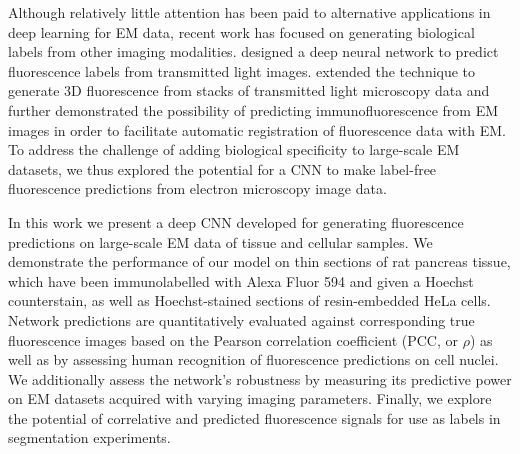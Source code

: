 Although relatively little attention has been paid to alternative applications in deep learning for EM data, recent work has focused on generating biological labels from other imaging modalities. \textcite{christiansen2018silico} designed a deep neural network to predict fluorescence labels from transmitted light images. \textcite{ounkomol2018label} extended the technique to generate 3D fluorescence from stacks of transmitted light microscopy data and further demonstrated the possibility of predicting immunofluorescence from EM images in order to facilitate automatic registration of fluorescence data with EM. To address the challenge of adding biological specificity to large-scale EM datasets, we thus explored the potential for a CNN to make label-free fluorescence predictions from electron microscopy image data.

In this work we present a deep CNN developed for generating fluorescence predictions on large-scale EM data of tissue and cellular samples. We demonstrate the performance of our model on thin sections of rat pancreas tissue, which have been immunolabelled with Alexa Fluor 594 and given a Hoechst counterstain, as well as Hoechst-stained sections of resin-embedded HeLa cells. Network predictions are quantitatively evaluated against corresponding true fluorescence images based on the Pearson correlation coefficient (PCC, or $\rho$) as well as by assessing human recognition of fluorescence predictions on cell nuclei. We additionally assess the network's robustness by measuring its predictive power on EM datasets acquired with varying imaging parameters. Finally, we explore the potential of correlative and predicted fluorescence signals for use as labels in segmentation experiments.







